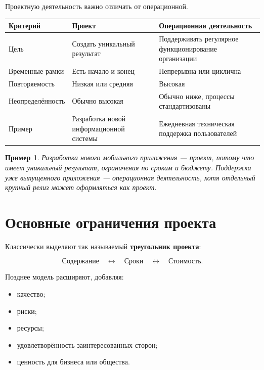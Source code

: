 \documentclass[12pt,a4paper]{article}
\newtheorem{example}{Пример}
\begin{document}
Проектную деятельность важно отличать от операционной.

\begin{longtable}{|p{}|p{}|p{}|}
\hline
\textbf{Критерий} & \textbf{Проект} & \textbf{Операционная деятельность} \\
\hline
Цель & Создать уникальный результат & Поддерживать регулярное функционирование организации \\
\hline
Временные рамки & Есть начало и конец & Непрерывна или циклична \\
\hline
Повторяемость & Низкая или средняя & Высокая \\
\hline
Неопределённость & Обычно высокая & Обычно ниже, процессы стандартизованы \\
\hline
Пример & Разработка новой информационной системы & Ежедневная техническая поддержка пользователей \\
\hline
\end{longtable}

\begin{example}
Разработка нового мобильного приложения --- проект, потому что имеет уникальный результат, ограничения по срокам и бюджету. Поддержка уже выпущенного приложения --- операционная деятельность, хотя отдельный крупный релиз может оформляться как проект.
\end{example}

\section{Основные ограничения проекта}

Классически выделяют так называемый \textbf{треугольник проекта}:

\[
\text{Содержание} \quad \leftrightarrow \quad \text{Сроки} \quad \leftrightarrow \quad \text{Стоимость}.
\]

Позднее модель расширяют, добавляя:
\begin{itemize}
    \item качество;
    \item риски;
    \item ресурсы;
    \item удовлетворённость заинтересованных сторон;
    \item ценность для бизнеса или общества.
\end{itemize}

\begin{center}
\end{center}
\end{document}
